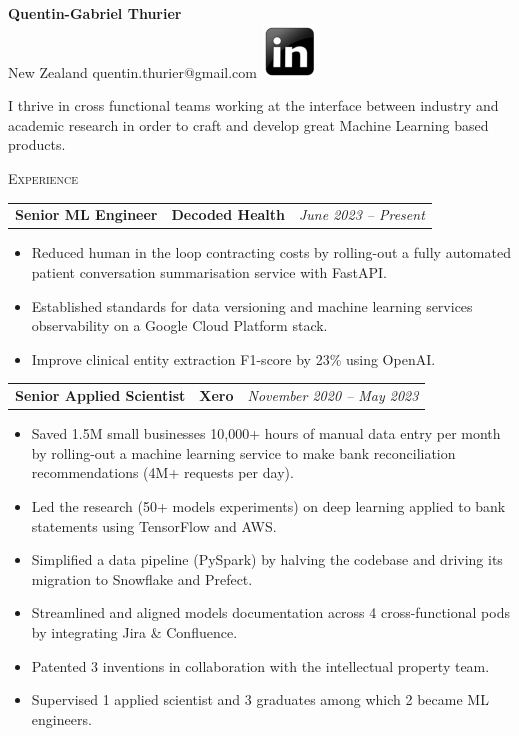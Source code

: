 \documentclass[letterpaper,11pt]{article}
\renewcommand{\section}[1]{{\vspace{0.3cm}}{\scshape\color{blue}#1}{\color{blue}\hrulefill}{\vspace{0.2cm}}}
\newcommand{\resumeItemListStart}{\begin{itemize}[label=$\circ$, topsep=0.1cm, parsep=0cm, partopsep=0cm, itemsep=0.1cm, leftmargin=0.4cm]}
\newcommand{\resumeItem}[1]{\item\small{#1}}
\newcommand{\resumeItemListEnd}{\end{itemize}}
\newcommand{\job}[4]{
    \begin{tabular}{p{7cm}p{6cm}p{5cm}}
      \hspace{-0.7em} \textbf{#1} & \textbf{\small{#2}} & \hfill \textit{\small{#4}}
    \end{tabular}
}
\begin{document}
 

\begin{center}
  \textbf{\Large Quentin-Gabriel Thurier} \\
  \small{New Zealand} \textbar{}
  \small{quentin.thurier@gmail.com} \textbar{}
  \href{https://www.linkedin.com/in/quentin-gabriel-thurier-36586021/}{\includegraphics[scale=0.6,valign=b]{linkedin}} %
\end{center}

I thrive in cross functional teams working at the interface between industry and academic research in order to craft and develop great Machine Learning based products. 

\section{Experience}

\job {Senior ML Engineer}{Decoded Health}{Auckland}{June 2023 -- Present}
\resumeItemListStart
\resumeItem {Reduced human in the loop contracting costs by rolling-out a fully automated patient conversation summarisation service with FastAPI.}
\resumeItem {Established standards for data versioning and machine learning services observability on a Google Cloud Platform stack.}
\resumeItem {Improve clinical entity extraction F1-score by 23\% using OpenAI.}
\resumeItemListEnd \vspace{0.2cm}

\job {Senior Applied Scientist}{Xero}{Auckland}{November 2020 -- May 2023}
\resumeItemListStart
\resumeItem {Saved 1.5M small businesses 10,000+ hours of manual data entry per month by rolling-out a machine learning service to make bank reconciliation recommendations (4M+ requests per day).}
\resumeItem {Led the research (50+ models experiments) on deep learning applied to bank statements using TensorFlow and AWS.}
\resumeItem {Simplified a data pipeline (PySpark) by halving the codebase and driving its migration to Snowflake and Prefect.}
\resumeItem {Streamlined and aligned models documentation across 4 cross-functional pods by integrating Jira \& Confluence.}
\resumeItem {Patented 3 inventions in collaboration with the intellectual property team.}
\resumeItem {Supervised 1 applied scientist and 3 graduates among which 2 became ML engineers.}
\resumeItemListEnd \vspace{0.2cm}
\end{document}
